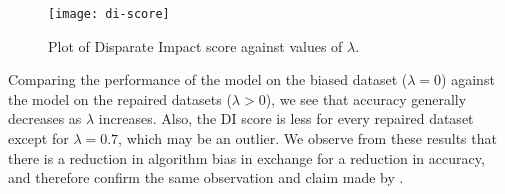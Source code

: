 \documentclass[conference]{IEEEtran}
\begin{document}
\begin{figure}[ht]
    \centering
    \texttt{[image: di-score]}
    \caption{Plot of Disparate Impact score against values of $\lambda$.}
    \label{fig:2}
\end{figure}

Comparing the performance of the model on the biased dataset ($\lambda = 0$) against the model on the repaired datasets ($\lambda > 0$), we see that accuracy generally decreases as $\lambda$ increases. Also, the DI score is less for every repaired dataset except for $\lambda=0.7$, which may be an outlier. We observe from these results that there is a reduction in algorithm bias in exchange for a reduction in accuracy, and therefore confirm the same observation and claim made by \cite{Feldman2015ComputationalFP}.



\end{document}
